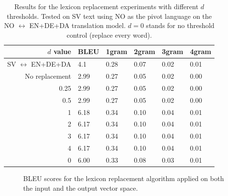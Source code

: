\documentclass[thesis]{cluu}
\begin{document}
\begin{table}
  \centering
  \begin{tabular}{r|*{5}{l}}
    \hline
    \textbf{$d$ value} & \textbf{BLEU} & \textbf{1gram} & \textbf{2gram} & \textbf{3gram} & \textbf{4gram} \\ [0.25ex]
    \hline\hline
    SV $\leftrightarrow$ EN+DE+DA & 4.1 & 0.28 & 0.07 & 0.02 & 0.01 \\
    \hline
    No replacement & 2.99 & 0.27 & 0.05 & 0.02 & 0.00 \\
    0.25 & 2.99 & 0.27 & 0.05 & 0.02 & 0.00 \\
    0.5 & 2.99 & 0.27 & 0.05 & 0.02 & 0.00 \\
    1 & 6.18 & 0.34 & 0.10 & 0.04 & 0.01 \\
    2 & 6.17 & 0.34 & 0.10 & 0.04 & 0.01 \\
    3 & 6.17 & 0.34 & 0.10 & 0.04 & 0.01 \\
    4 & 6.17 & 0.34 & 0.10 & 0.04 & 0.01 \\
    0 & 6.00 & 0.33 & 0.08 & 0.03 & 0.01 \\
    \hline
  \end{tabular}
  \caption{Results for the lexicon replacement experiments with different $d$ thresholds. Tested on SV text using NO as the pivot language on the NO $\leftrightarrow$ EN+DE+DA translation model. $d=0$ stands for no threshold control (replace every word).}
  \label{table:lexicon_replacement}
\end{table}

\begin{figure}
  \centering
  \caption{BLEU scores for the lexicon replacement algorithm applied on both the input and the output vector space.}
  \label{fig:lexicon_replacement}
\end{figure}
\end{document}

